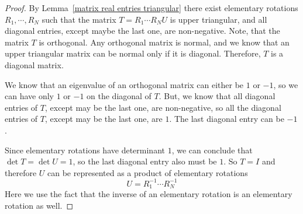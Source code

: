 \begin{proof}
By Lemma~\ref{matrix real entries triangular} there exist elementary rotations $R_1,\cdots,R_N$ such that the matrix $T=R_1\cdots R_NU$ is upper triangular, and all diagonal entries, except maybe the last one, are non-negative. Note, that the matrix $T$ is orthogonal. Any orthogonal matrix is normal, and we know that an upper triangular matrix can be normal only if it is diagonal. Therefore, $T$ is a diagonal matrix.\par
We know that an eigenvalue of an orthogonal matrix can either be $1$ or $-1$, so we can have only $1$ or $-1$ on the diagonal of $T$. But, we know that all diagonal entries of $T$, except may be the last one, are non-negative, so all the diagonal entries of $T$, except may be the last one, are $1$. The last diagonal entry can be $-1$.\par
Since elementary rotations have determinant $1$, we can conclude that $\det T=\det U=1$, so the last diagonal entry also must be $1$. So $T=I$ and therefore $U$ can be represented as a product of elementary rotations
\[U=R_1^{-1}\cdots R_{N}^{-1}\]
Here we use the fact that the inverse of an elementary rotation is an elementary rotation as well.
\end{proof}
